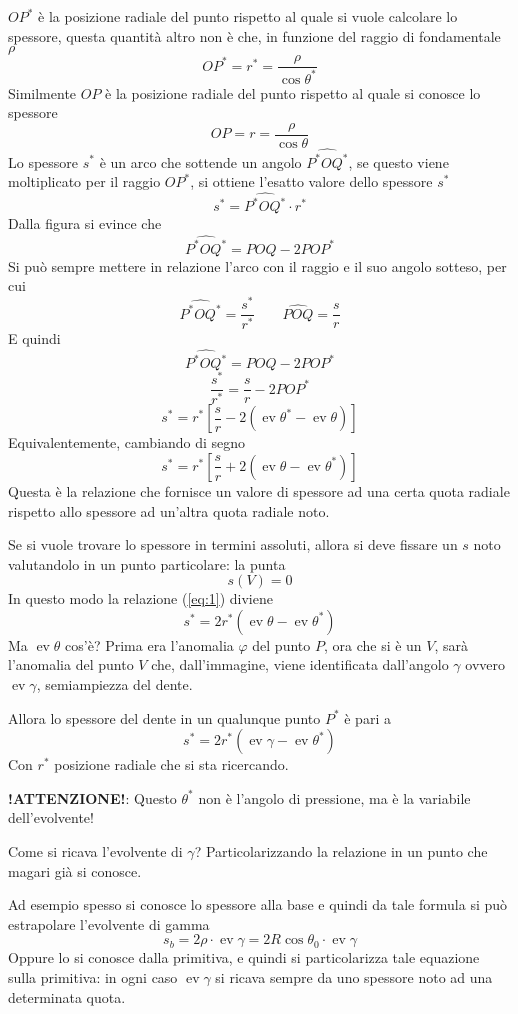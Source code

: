 \documentclass[a4paper, 15pt]{article}
\DeclareMathOperator{\ev}{ev}
\begin{document}
\begin{adjustwidth}{2in}{}
		$OP^*$ è la posizione radiale del punto rispetto al quale si vuole calcolare lo spessore, questa quantità altro non è che, in funzione del raggio di fondamentale $\rho$
		\[OP^* = r^* = \dfrac{\rho}{\cos\theta^*}\] 
		Similmente $OP$ è la posizione radiale del punto rispetto al quale si conosce lo spessore
		\[OP = r = \dfrac{\rho}{\cos\theta}\] 		
		Lo spessore $s^*$ è un arco che sottende un angolo $\hat{P^*OQ^*}$, se questo viene moltiplicato per il raggio $OP^*$, si ottiene l'esatto valore dello spessore $s^*$
		\[s^* = \hat{P^*OQ^*}\cdot r^*\] 
		Dalla figura si evince che 
		\[\hat{P^*OQ^*} = POQ - 2POP^*\] 
		Si può sempre mettere in relazione l'arco con il raggio e il suo angolo sotteso, per cui
		\[\hat{P^*OQ^*} = \dfrac{s^*}{r^*}\qquad\hat{POQ} = \dfrac{s}{r}\]
		E quindi
		\[\hat{P^*OQ^*} = POQ - 2POP^*\]
		\[\dfrac{s^*}{r^*} = \dfrac{s}{r} - 2POP^*\]
		\[s^* = r^*\left[\dfrac{s}{r} - 2(\ev\theta^*-\ev\theta)\right]\]
		Equivalentemente, cambiando di segno
		\begin{equation}\label{eq:1}
			s^* = r^*\left[\dfrac{s}{r} + 2(\ev\theta-\ev\theta^*)\right]
		\end{equation}
		Questa è la relazione che fornisce un valore di spessore ad una certa quota radiale rispetto allo spessore ad un'altra quota radiale noto.\newline 
		
		Se si vuole trovare lo spessore in termini assoluti, allora si deve fissare un $s$ noto valutandolo in un punto particolare: la punta
		\[s(V) = 0\] 
		In questo modo la relazione (\ref{eq:1}) diviene
		\[s^* = 2r^*(\ev\theta-\ev\theta^*)\] 
		Ma $\ev\theta$ cos'è? Prima era l'anomalia $\varphi$ del punto $P$, ora che si è un $V$, sarà l'anomalia del punto $V$ che, dall'immagine, viene identificata dall'angolo $\gamma$ ovvero $\ev\gamma$, semiampiezza del dente. \newline  
		
		Allora lo spessore del dente in un qualunque punto $P^*$ è pari a 
		\[s^* = 2r^*(\ev\gamma-\ev\theta^*)\]  
		Con $r^*$ posizione radiale che si sta ricercando. 
		
		
		\textbf{!ATTENZIONE!}: Questo $\theta^*$ non è l'angolo di pressione, ma è la variabile dell'evolvente! \newline
		
		Come si ricava  l'evolvente di $\gamma$? Particolarizzando la relazione in un punto che magari già si conosce.
		
		Ad esempio spesso si conosce lo spessore alla base e quindi da tale formula si può estrapolare l'evolvente di gamma
		\[s_b = 2\rho\cdot\ev\gamma = 2R\cos\theta_0\cdot\ev\gamma\] 
		Oppure lo si conosce dalla primitiva, e quindi si particolarizza tale equazione sulla primitiva: in ogni caso $\ev\gamma$ si ricava sempre da uno spessore noto ad una determinata quota.
		    

\end{adjustwidth}
\end{document}
